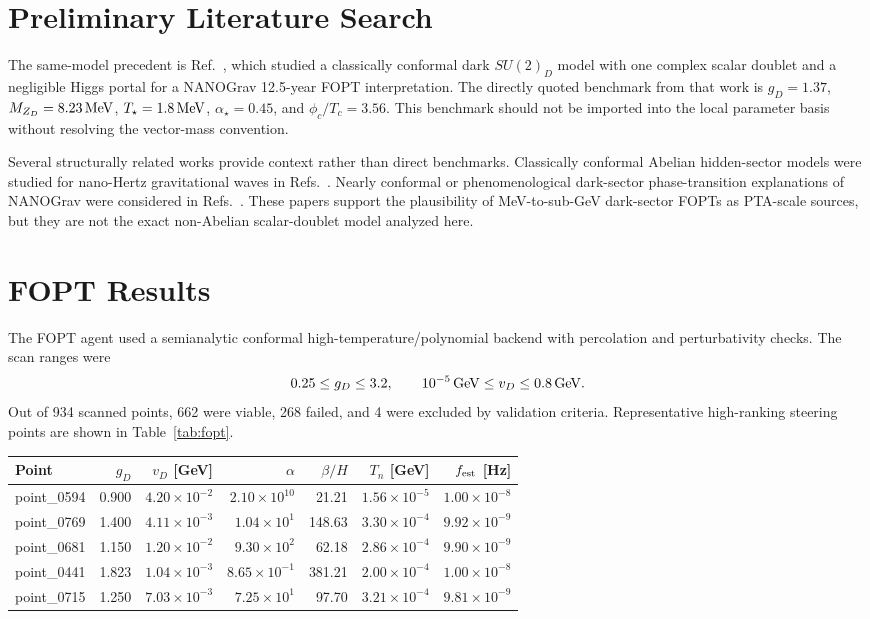 \documentclass[11pt]{article}
\newcommand{\SUtwoD}{\ensuremath{SU(2)_D}}
\newcommand{\gev}{\,{\rm GeV}}
\begin{document}
\section{Preliminary Literature Search}
The same-model precedent is Ref.~\cite{Borah2021}, which studied a classically conformal dark \SUtwoD{} model with one complex scalar doublet and a negligible Higgs portal for a NANOGrav 12.5-year FOPT interpretation. The directly quoted benchmark from that work is $g_D=1.37$, $M_{Z_D}=8.23\,{\rm MeV}$, $T_\star=1.8\,{\rm MeV}$, $\alpha_\star=0.45$, and $\phi_c/T_c=3.56$. This benchmark should not be imported into the local parameter basis without resolving the vector-mass convention.

Several structurally related works provide context rather than direct benchmarks. Classically conformal Abelian hidden-sector models were studied for nano-Hertz gravitational waves in Refs.~\cite{Balan2025,Goncalves2025}. Nearly conformal or phenomenological dark-sector phase-transition explanations of NANOGrav were considered in Refs.~\cite{Fujikura2023,Bringmann2023}. These papers support the plausibility of MeV-to-sub-GeV dark-sector FOPTs as PTA-scale sources, but they are not the exact non-Abelian scalar-doublet model analyzed here.

\section{FOPT Results}
The FOPT agent used a semianalytic conformal high-temperature/polynomial backend with percolation and perturbativity checks. The scan ranges were
\[
0.25\le g_D\le 3.2,\qquad 10^{-5}\gev\le v_D\le 0.8\gev.
\]
Out of 934 scanned points, 662 were viable, 268 failed, and 4 were excluded by validation criteria. Representative high-ranking steering points are shown in Table~\ref{tab:fopt}.

\begin{center}
\label{tab:fopt}
\begin{tabular}{lrrrrrr}
\toprule
Point & $g_D$ & $v_D$ [GeV] & $\alpha$ & $\beta/H$ & $T_n$ [GeV] & $f_{\rm est}$ [Hz]\\
\midrule
point\_0594 & 0.900 & $4.20\times10^{-2}$ & $2.10\times10^{10}$ & 21.21 & $1.56\times10^{-5}$ & $1.00\times10^{-8}$\\
point\_0769 & 1.400 & $4.11\times10^{-3}$ & $1.04\times10^{1}$ & 148.63 & $3.30\times10^{-4}$ & $9.92\times10^{-9}$\\
point\_0681 & 1.150 & $1.20\times10^{-2}$ & $9.30\times10^{2}$ & 62.18 & $2.86\times10^{-4}$ & $9.90\times10^{-9}$\\
point\_0441 & 1.823 & $1.04\times10^{-3}$ & $8.65\times10^{-1}$ & 381.21 & $2.00\times10^{-4}$ & $1.00\times10^{-8}$\\
point\_0715 & 1.250 & $7.03\times10^{-3}$ & $7.25\times10^{1}$ & 97.70 & $3.21\times10^{-4}$ & $9.81\times10^{-9}$\\
\bottomrule
\end{tabular}
\end{center}
\end{document}
